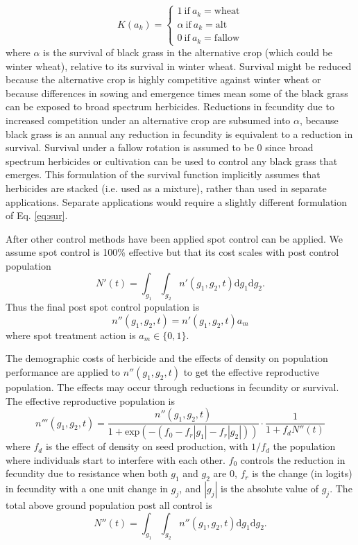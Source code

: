 \documentclass[12pt, a4paper]{article}
\begin{document}
\begin{equation}
	K(a_k) = \begin{cases}
		1~\text{if}~a_k = \text{wheat}\\
		\alpha~\text{if}~a_k = \text{alt}\\
		0~\text{if}~a_k = \text{fallow}		
	\end{cases}
\end{equation}	
where $\alpha$ is the survival of black grass in the alternative crop (which could be winter wheat), relative to its survival in winter wheat. Survival might be reduced because the alternative crop is highly competitive against winter wheat or because differences in sowing and emergence times mean some of the black grass can be exposed to broad spectrum herbicides. Reductions in fecundity due to increased competition under an alternative crop are subsumed into $\alpha$, because black grass is an annual any reduction in fecundity is equivalent to a reduction in survival. Survival under a fallow rotation is assumed to be 0 since broad spectrum herbicides or cultivation can be used to control any black grass that emerges. This formulation of the survival function implicitly assumes that herbicides are stacked (i.e. used as a mixture), rather than used in separate applications. Separate applications would require a slightly different formulation of Eq. \ref{eq:sur}.

After other control methods have been applied spot control can be applied. We assume spot control is 100\% effective but that its cost scales with post control population
\begin{equation}\label{eq:tot_pop1}
	N'(t) = \int_{g_1}\int_{g_2} n'(g_1, g_2, t) \text{d}g_1\text{d}g_2. 
\end{equation}
Thus the final post spot control population is 
\begin{equation}\label{eq:spot_cont}
	n''(g_1, g_2, t) = n'(g_1, g_2, t)a_m
\end{equation}   
where spot treatment action is $a_m \in \{0, 1\}$.
 
The demographic costs of herbicide and the effects of density on population performance are applied to $n''(g_1, g_2, t)$ to get the effective reproductive population. The effects may occur through reductions in fecundity or survival. The effective reproductive population is
\begin{equation}\label{eq:eff_pop}
	n'''(g_1, g_2, t) = \frac{n''(g_1, g_2, t)}{1 + \text{exp}(-(f_0 - f_r|g_1| - f_r|g_2|))} \cdot \frac{1}{1 + f_d N''(t)}
\end{equation}     
where $f_d$ is the effect of density on seed production, with $1/f_d$ the population where individuals start to interfere with each other. $f_0$ controls the reduction in fecundity due to resistance when both $g_1$ and $g_2$ are 0, $f_r$ is the change (in logits) in fecundity with a one unit change in $g_j$, and $|g_j|$ is the absolute value of $g_j$. The total above ground population post all control is
\begin{equation}\label{eq:tot_pop2}
	N''(t) = \int_{g_1}\int_{g_2} n''(g_1, g_2, t) \text{d}g_1\text{d}g_2. 
\end{equation}
\end{document}
